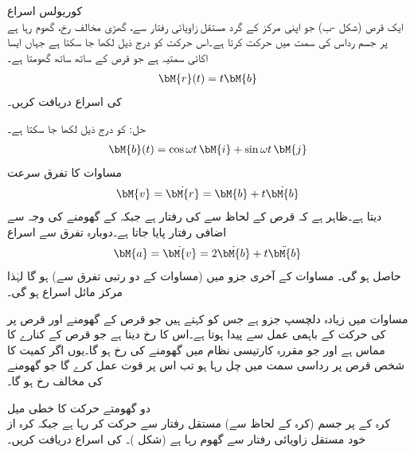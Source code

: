 \quad کوریولس اسراع\\ 
ایک قرص (شکل -ب) جو اپنی مرکز کے گرد مستقل زاویائی رفتار  سے، گھڑی  مخالف رخ، گھوم رہا ہے پر جسم   رداس کی سمت میں حرکت کرتا ہے۔اس حرکت کو درج ذیل لکھا جا سکتا ہے جہاں  ایسا اکائی سمتیہ ہے جو قرص کے ساتھ ساتھ گھومتا ہے۔
\begin{align}\label{مساوات_الاحصاء_مثال_کوریولس_الف}
\bM{r}(t)=t\bM{b}
\end{align}
 کی اسراع دریافت کریں۔

حل: کو درج ذیل لکھا جا سکتا ہے۔
\begin{align}\label{مساوات_الاحصاء_مثال_کوریولس_ب}
\bM{b}(t)=\cos \omega t \,\bM{i}+\sin \omega t \, \bM{j}
\end{align}
مساوات  کا تفرق سرعت
\begin{align}\label{مساوات_الاحصاء_مثال_کوریولس_پ}
\bM{v}=\dot{\bM{r}}=\bM{b}+t\dot{\bM{b}}
\end{align}
دیتا ہے۔ظاہر ہے کہ قرص کے لحاظ سے  کی رفتار  ہے جبکہ  کے گھومنے کی وجہ سے اضافی رفتار  پایا جاتا ہے۔دوبارہ تفرق سے اسراع 
\begin{align}\label{مساوات_الاحصاء_مثال_کوریولس_ت}
\bM{a}=\dot{\bM{v}}=2\dot{\bM{b}}+t\ddot{\bM{b}}
\end{align}
حاصل ہو گی۔ مساوات  کے آخری جزو میں (مساوات   کے دو رتبی تفرق سے)   ہو گا لہٰذا  مرکز مائل اسراع ہو گی۔

 مساوات  میں زیادہ دلچسپ جزو  ہے جس کو  کہتے ہیں  جو قرص کے گھومنے  اور قرص پر  کی حرکت  کے باہمی عمل سے پیدا ہوتا ہے۔اس کا رخ  دیتا ہے جو قرص کے کنارے کا مماس ہے اور جو  مقررہ  کارتیسی نظام میں گھومنے کی رخ ہو گا۔یوں اگر کمیت   کا شخص قرص پر رداسی سمت میں چل رہا ہو تب اس پر قوت  عمل کرے گا جو گھومنے کی مخالف رخ ہو گا۔ 

\quad دو گھومتے حرکت کا خطی میل\\
کرہ کے   پر جسم   (کرہ کے لحاظ سے) مستقل رفتار سے حرکت کر رہا ہے جبکہ کرہ از خود مستقل زاویائی رفتار   سے گھوم رہا ہے (شکل )۔  کی اسراع دریافت کریں۔

